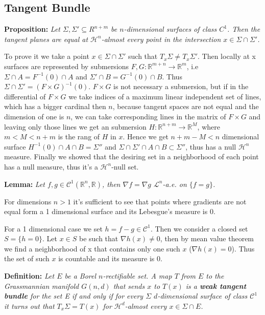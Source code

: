 \documentclass{article}
\begin{document}
\subsection{Tangent Bundle}

\textbf{Proposition:} \textit{Let $\Sigma, \Sigma′\subseteq R^{n+m}$ be
$n$-dimensional surfaces of class $C^1$. Then the tangent planes are equal at 
$\mathcal H^n$-almost every point in the intersection $x∈\Sigma\cap\Sigma′$.}

\vspace{1ex}
To prove it we take a point $x\in\Sigma\cap\Sigma'$ such that $T_x\Sigma\neq T_x
\Sigma'$. Then locally at x surfaces are represented by submersions $F,G:\mathbb
R^{m+n}\rightarrow\mathbb R^m$, i.e $\Sigma\cap A=F^{-1}(0)\cap A$ and
$\Sigma'\cap B=G^{-1}(0)\cap B$. Thus $\Sigma\cap\Sigma'=(F\times G)^{-1}(0)$.
$F\times G$ is not necessary a submersion, but if in the differential of $F
\times G$ we take indices of a maximum linear independent set of lines, which
has a bigger cardinal then $n$, because tangent spaces are not equal and the
dimension of one is $n$, we can take corresponding lines in the matrix of $F
\times G$ and leaving only those lines we get an submersion $H:\mathbb R^{n+m}
\rightarrow\mathbb R^{M}$, where $m<M<n+m$ is the rang of $H$ in $x$. Hence we
get $n+m-M<n$ dimensional surface $H^{-1}(0)\cap A\cap B=\Sigma''$ and $\Sigma\cap\Sigma'\cap A\cap B
\subset\Sigma''$, thus has a null $\mathcal H^n$ measure. Finally we showed
that the desiring set in a neighborhood of each point has a null measure, thus
it's a $\mathcal H^n$-null set.

\vspace{2ex}
\textbf{Lemma:} \textit{Let $f,g\in\mathcal C^1(\mathbb R^n, \mathbb R)$, then $\nabla f
=\nabla g$ $\mathcal L^n$-a.e. on $\{f=g\}$.}

\vspace{1ex}
For dimensions $n>1$ it's sufficient to see that points where gradients are not
equal form a 1 dimensional surface and its Lebesgue's measure is 0. 

For a 1 dimensional case we set $h=f-g\in\mathcal C^1$. Then we consider a
closed set $S=\{h=0\}$. Let $x\in S$ be such that $\nabla h(x)\neq 0$, then
by mean value theorem we find a neighborhood of x that contains only one such
$x$ ($\nabla h(x)=0$). Thus the set of such $x$ is countable and its measure is
0.

\vspace{2ex}
\textbf{Definition:} \textit{Let $E$ be a Borel $n$-rectifiable set. A map $T$
from $E$ to the Grassmannian manifold $G(n, d)$ that sends $x$ to $T(x)$ is a
\textbf{weak tangent bundle} for the set E if and only if for every $\Sigma$ $d$-dimensional
surface of class $\mathcal C^1$ it turns out that $T_x\Sigma = T(x)$ for $\mathcal
H^d$-almost every $x\in\Sigma\cap E$.}
\end{document}
